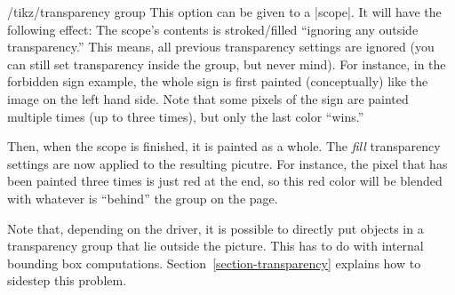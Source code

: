 \begin{key}{/tikz/transparency group}
  This option can be given to a |scope|. It will have the following
  effect: The scope's contents is stroked/filled
  ``ignoring any outside transparency.'' This means, all previous
  transparency settings are ignored (you can still set transparency
  inside the group, but never mind). For instance, in the forbidden
  sign example, the whole sign is first painted (conceptually) like
  the image on the left hand side. Note that some pixels of the sign
  are painted multiple times (up to three times), but only the last
  color ``wins.''

  Then, when the scope is finished, it is painted as a whole. The  
  \emph{fill} transparency settings are now applied to the resulting
  picutre. For instance, the pixel that has been painted three times
  is just red at the end, so this red color will be blended with
  whatever is ``behind'' the group on the page.

  Note that, depending on the driver, it is possible to directly put
  objects in a transparency group that lie outside the picture. This
  has to do with internal bounding box computations.
  Section~\ref{section-transparency} explains how to sidestep this
  problem.   
\end{key}



